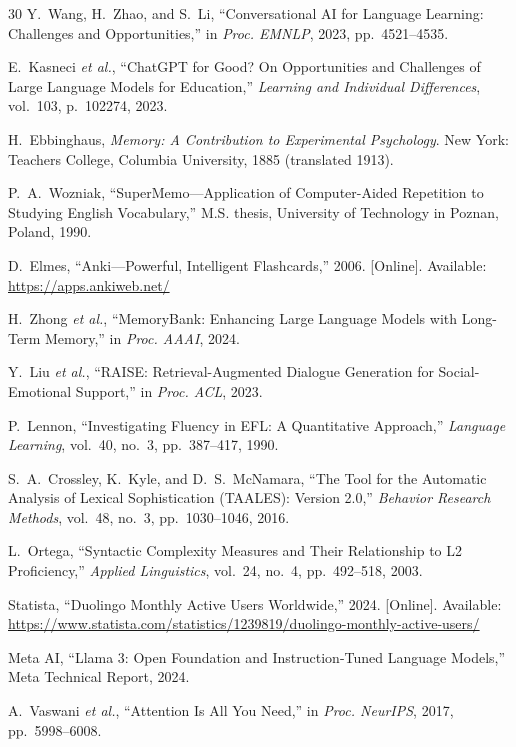 \documentclass[conference]{IEEEtran}
\begin{document}
\begin{thebibliography}{30}
Y.~Wang, H.~Zhao, and S.~Li, ``Conversational AI for Language Learning: Challenges and Opportunities,'' in \textit{Proc. EMNLP}, 2023, pp.~4521--4535.

E.~Kasneci \textit{et al.}, ``ChatGPT for Good? On Opportunities and Challenges of Large Language Models for Education,'' \textit{Learning and Individual Differences}, vol.~103, p.~102274, 2023.

H.~Ebbinghaus, \textit{Memory: A Contribution to Experimental Psychology}. New York: Teachers College, Columbia University, 1885 (translated 1913).

P.~A.~Wozniak, ``SuperMemo---Application of Computer-Aided Repetition to Studying English Vocabulary,'' M.S. thesis, University of Technology in Poznan, Poland, 1990.

D.~Elmes, ``Anki---Powerful, Intelligent Flashcards,'' 2006. [Online]. Available: \url{https://apps.ankiweb.net/}

H.~Zhong \textit{et al.}, ``MemoryBank: Enhancing Large Language Models with Long-Term Memory,'' in \textit{Proc. AAAI}, 2024.

Y.~Liu \textit{et al.}, ``RAISE: Retrieval-Augmented Dialogue Generation for Social-Emotional Support,'' in \textit{Proc. ACL}, 2023.

P.~Lennon, ``Investigating Fluency in EFL: A Quantitative Approach,'' \textit{Language Learning}, vol.~40, no.~3, pp.~387--417, 1990.

S.~A.~Crossley, K.~Kyle, and D.~S.~McNamara, ``The Tool for the Automatic Analysis of Lexical Sophistication (TAALES): Version 2.0,'' \textit{Behavior Research Methods}, vol.~48, no.~3, pp.~1030--1046, 2016.

L.~Ortega, ``Syntactic Complexity Measures and Their Relationship to L2 Proficiency,'' \textit{Applied Linguistics}, vol.~24, no.~4, pp.~492--518, 2003.

Statista, ``Duolingo Monthly Active Users Worldwide,'' 2024. [Online]. Available: \url{https://www.statista.com/statistics/1239819/duolingo-monthly-active-users/}

Meta AI, ``Llama 3: Open Foundation and Instruction-Tuned Language Models,'' Meta Technical Report, 2024.

A.~Vaswani \textit{et al.}, ``Attention Is All You Need,'' in \textit{Proc. NeurIPS}, 2017, pp.~5998--6008.


\end{thebibliography}
\end{document}
